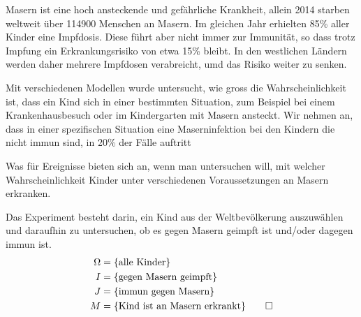 Masern ist eine hoch ansteckende und gefährliche Krankheit,
allein 2014 starben weltweit über 114900 Menschen an Masern.
Im gleichen Jahr erhielten 85\% aller Kinder eine Impfdosis.
Diese führt aber nicht immer zur Immunität, so dass trotz Impfung
ein Erkrankungsrisiko von etwa 15\% bleibt.
In den westlichen Ländern werden daher mehrere Impfdosen verabreicht,
umd das Risiko weiter zu senken.

Mit verschiedenen Modellen wurde untersucht, wie gross die Wahrscheinlichkeit
ist, dass ein Kind sich in einer bestimmten Situation, zum Beispiel
bei einem Krankenhausbesuch oder im Kindergarten mit Masern ansteckt.
Wir nehmen an, dass in einer spezifischen Situation eine Maserninfektion
bei den Kindern die nicht immun sind, in 20\% der Fälle auftritt

Was für Ereignisse bieten sich an, wenn man untersuchen will, mit welcher
Wahrscheinlichkeit Kinder unter verschiedenen Voraussetzungen
an Masern erkranken.

\begin{loesung}
Das Experiment besteht darin, ein Kind aus der Weltbevölkerung auszuwählen
und daraufhin zu untersuchen, ob es gegen Masern geimpft ist und/oder
dagegen immun ist.
\begin{align*}
\Omega &= \{\text{alle Kinder}\}
\\
I&=\{\text{gegen Masern geimpft}\}
\\
J&=\{\text{immun gegen Masern}\}
\\
M&=\{\text{Kind ist an Masern erkrankt}\}
\qedhere
\end{align*}
\end{loesung}
